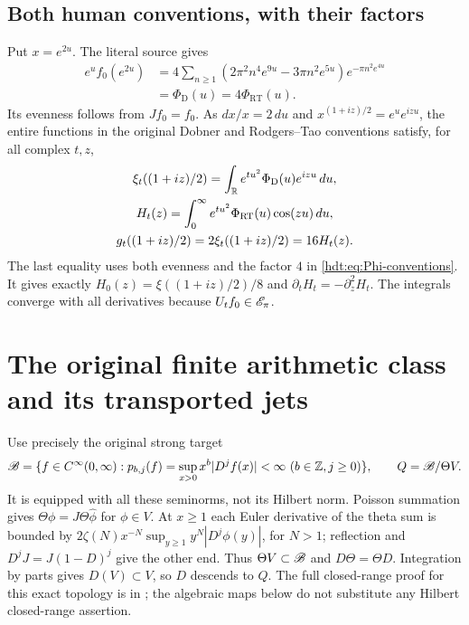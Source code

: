 \subsection{Both human conventions, with their factors}
Put $x=e^{2u}$. The literal source gives
\begin{equation}\label{hdt:eq:Phi-conventions}
\begin{split}
e^u f_0(e^{2u})
&=4\sum_{n\geq1}(2\pi^2n^4e^{9u}-3\pi n^2e^{5u})
e^{-\pi n^2e^{4u}}\\
&=\Phi_{\mathrm D}(u)=4\Phi_{\mathrm{RT}}(u).
\end{split}
\end{equation}
Its evenness follows from $Jf_0=f_0$. As $dx/x=2\,du$ and
$x^{(1+iz)/2}=e^ue^{izu}$, the entire functions in the original
Dobner and Rodgers--Tao conventions satisfy, for all complex $t,z$,
\begin{equation}\label{hdt:eq:constants}
\begin{gathered}
\xi_t((1+iz)/2)=\int_\mathbb R e^{tu^2}\Phi_{\mathrm D}(u)e^{izu}\,du,\\
H_t(z)=\int_0^\infty e^{tu^2}\Phi_{\mathrm{RT}}(u)\cos(zu)\,du,\\
g_t((1+iz)/2)=2\xi_t((1+iz)/2)=16H_t(z).
\end{gathered}
\end{equation}
The last equality uses both evenness and the factor $4$ in
\eqref{hdt:eq:Phi-conventions}. It gives exactly
$H_0(z)=\xi((1+iz)/2)/8$ and $\partial_tH_t=-\partial_z^2H_t$.
The integrals converge with all derivatives because $U_tf_0\in\mathscr E_\pi$.

\section{The original finite arithmetic class and its transported jets}

Use precisely the original strong target
\begin{equation}\label{hdt:eq:B}
\mathscr B=\{f\in C^\infty(0,\infty):
p_{b,j}(f)=\sup_{x>0}x^b|D^jf(x)|<\infty
\ (b\in\mathbb Z,j\geq0)\},\qquad Q=\mathscr B/\Theta V.
\end{equation}
It is equipped with all these seminorms, not its Hilbert norm.
Poisson summation gives $\Theta\phi=J\Theta\widehat\phi$ for
$\phi\in V$. At $x\geq1$ each Euler derivative of the theta sum
is bounded by $2\zeta(N)x^{-N}\sup_{y\geq1}y^N|D^j\phi(y)|$,
for $N>1$; reflection and $D^jJ=J(1-D)^j$ give the other end.
Thus $\Theta V\subset\mathscr B$ and $D\Theta=\Theta D$.
Integration by parts gives $D(V)\subset V$, so $D$ descends to $Q$.
The full closed-range proof for this exact topology is in
\cite{hdt:Closed}; the algebraic maps below do not substitute any
Hilbert closed-range assertion.

